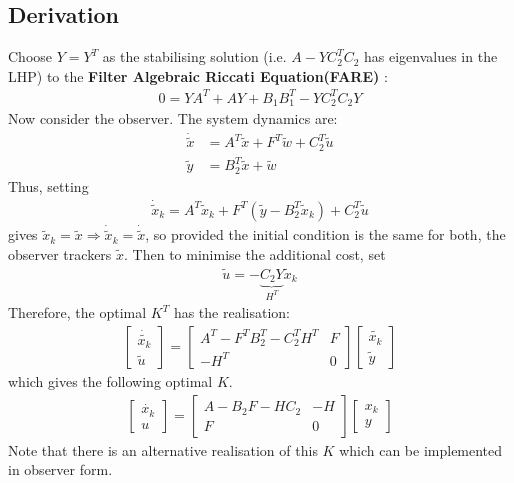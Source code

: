 \documentclass[a4paper]{article}
\newcommand{\ix}[1]{%
  \leavevmode %
  \marginpar{\small\emph{#1}}%
}
\begin{document}
\subsection*{Derivation}
Choose $Y = Y^T$ as the stabilising solution (i.e. $A - YC_2^TC_2$ has eigenvalues in the LHP) to the \textbf{Filter Algebraic Riccati Equation(FARE)}\ix{FARE}:\begin{align}
0 = YA^T + AY + B_1 B_1^T - Y C_2^T C_2 Y
\end{align}
Now consider the observer. The system dynamics are:
\begin{align}
\dot{\tilde{x}} &= A^T \tilde{x} + F^T \tilde{w} + C_2^T \tilde{u} \\
\tilde{y} &= B_2^T \tilde{x} + \tilde{w}
\end{align}
Thus, setting
\begin{align}
\dot{\tilde{x}}_k = A^T \tilde{x}_k + F^T (\tilde{y} - B_2^T \tilde{x}_k) + C_2^T \tilde{u}
\end{align}
gives $\tilde{x}_k = \tilde{x} \Rightarrow \dot{\tilde{x}}_k = \dot{\tilde{x}}$, so provided the initial condition is the same for both, the observer trackers $\tilde{x}$. Then to minimise the additional cost, set
\begin{align}
\tilde{u} = -\underbrace{C_2 Y}_{H^T} \tilde{x}_k
\end{align}
Therefore, the optimal $K^T$ has the realisation:
\begin{align}
\begin{bmatrix}
\dot{\tilde{x_k}} \\
\tilde{u}
\end{bmatrix}
= \begin{bmatrix}
A^T - F^T B_2^T - C_2^T H^T & F \\
-H^T & 0
\end{bmatrix}\begin{bmatrix}
\tilde{x_k} \\
\tilde{y}
\end{bmatrix}
\end{align}
which gives the following optimal $K$. 
\begin{align}
\begin{bmatrix}
\dot{x_k} \\
u
\end{bmatrix}
= \begin{bmatrix}
A - B_2 F - HC_2 & -H \\
F & 0
\end{bmatrix}\begin{bmatrix}
x_k \\
y
\end{bmatrix}
\end{align}
Note that there is an alternative realisation of this $K$ which can be implemented in observer form. 
\end{document}

